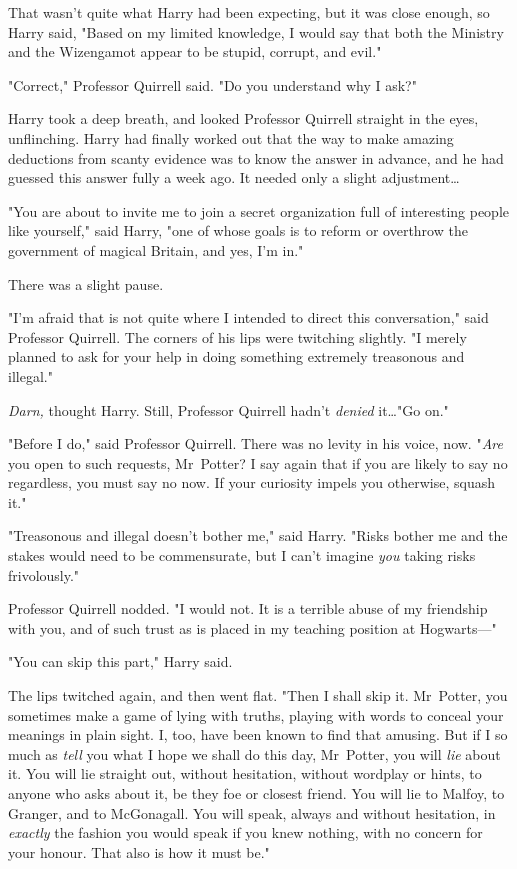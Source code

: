 That wasn’t quite what Harry had been expecting, but it was close enough, so
Harry said, "Based on my limited knowledge, I would say that both the Ministry
and the Wizengamot appear to be stupid, corrupt, and evil."

"Correct," Professor Quirrell said. "Do you understand why I ask?"

Harry took a deep breath, and looked Professor Quirrell straight in the eyes,
unflinching. Harry had finally worked out that the way to make amazing
deductions from scanty evidence was to know the answer in advance, and he had
guessed this answer fully a week ago. It needed only a slight adjustment…

"You are about to invite me to join a secret organization full of interesting
people like yourself," said Harry, "one of whose goals is to reform or
overthrow the government of magical Britain, and yes, I’m in."

There was a slight pause.

"I’m afraid that is not quite where I intended to direct this conversation,"
said Professor Quirrell. The corners of his lips were twitching slightly. "I
merely planned to ask for your help in doing something extremely treasonous and
illegal."

\emph{Darn,} thought Harry. Still, Professor Quirrell hadn’t \emph{denied}
it…"Go on."

"Before I do," said Professor Quirrell. There was no levity in his voice, now.
"\emph{Are} you open to such requests, Mr~Potter? I say again that if you are
likely to say no regardless, you must say no now. If your curiosity impels you
otherwise, squash it."

"Treasonous and illegal doesn’t bother me," said Harry. "Risks bother me and
the stakes would need to be commensurate, but I can’t imagine \emph{you} taking
risks frivolously."

Professor Quirrell nodded. "I would not. It is a terrible abuse of my
friendship with you, and of such trust as is placed in my teaching position at
Hogwarts—"

"You can skip this part," Harry said.

The lips twitched again, and then went flat. "Then I shall skip it. Mr~Potter,
you sometimes make a game of lying with truths, playing with words to conceal
your meanings in plain sight. I, too, have been known to find that amusing. But
if I so much as \emph{tell} you what I hope we shall do this day, Mr~Potter,
you will \emph{lie} about it. You will lie straight out, without hesitation,
without wordplay or hints, to anyone who asks about it, be they foe or closest
friend. You will lie to Malfoy, to Granger, and to McGonagall. You will speak,
always and without hesitation, in \emph{exactly} the fashion you would speak if
you knew nothing, with no concern for your honour. That also is how it must be."

